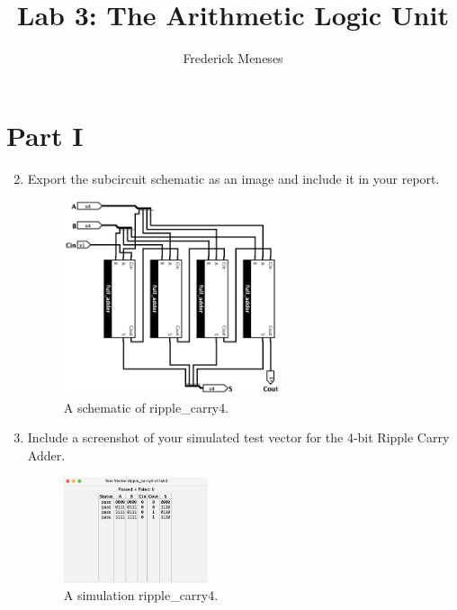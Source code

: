 \documentclass{article}
\title{Lab 3: The Arithmetic Logic Unit}
\author{Frederick Meneses}
\begin{document}
\maketitle

\section*{Part I}

\begin{enumerate}
\setcounter{enumi}{1}
\item Export the subcircuit schematic as an image and include it in your report.

\begin{figure}[ht!]
    \centering
    \includegraphics[width=0.6\textwidth]{lab3_part1.png}
    \caption{A schematic of ripple\_carry4.}
    \label{f:part1}
\end{figure}

\item Include a screenshot of your simulated test vector for the 4-bit Ripple Carry Adder.

\begin{figure}[ht!]
    \centering
    \includegraphics[width=0.4\textwidth]{lab3_part1_simulation.png}
    \caption{A simulation ripple\_carry4.}
    \label{f:part1_simulation}
\end{figure}
\end{enumerate}
\end{document}
